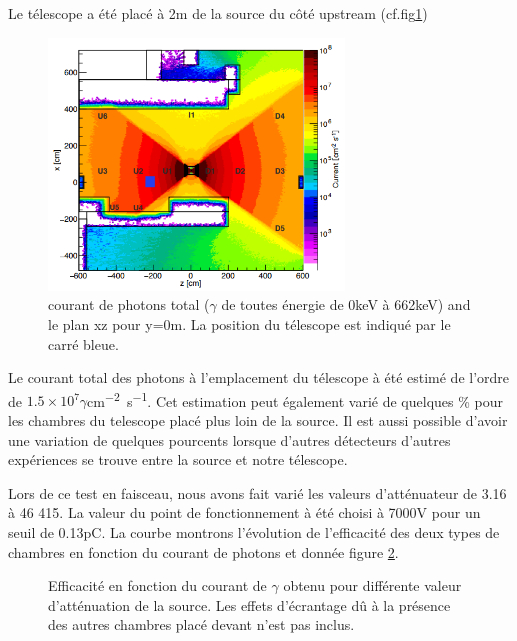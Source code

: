 Le télescope a été placé à 2m de la source du côté upstream (cf.fig\ref{PositionChambre})
\begin{figure}[!ht]
	\centering
	\includegraphics[width=0.7\textwidth]{GLA/PositionChamber.png}
	\caption{courant de photons total ($\gamma$ de toutes énergie de 0keV à 662keV) and le plan xz pour y=0m. La position du télescope est indiqué par le carré bleue.}
	\label{PositionChambre}
\end{figure}

Le courant total des photons à l'emplacement du télescope à été estimé de l'ordre de $1.5\times10^{7}\gamma$\si{cm^{-2}.s^{-1}}. Cet estimation peut également varié de quelques \% pour les chambres du telescope placé plus loin de la source. Il est aussi possible d'avoir une variation de quelques pourcents lorsque d'autres détecteurs d'autres expériences se trouve entre la source et notre télescope.

Lors de ce test en faisceau, nous avons fait varié les valeurs d'atténuateur de 3.16 à 46 415. La valeur du point de fonctionnement à été choisi à 7000V pour un seuil de 0.13pC. La courbe montrons l'évolution de l'efficacité des deux types de chambres en fonction du courant de photons et donnée figure \ref{ATTENUATEURGIF}.

\begin{figure}[!ht]
	\centering
	\scalebox{1.4}{}
	\caption{Efficacité en fonction du courant de $\gamma$ obtenu pour différente valeur d'atténuation de la source. Les effets d'écrantage dû à la présence des autres chambres placé devant n'est pas inclus.}
	\label{ATTENUATEURGIF}
\end{figure}




